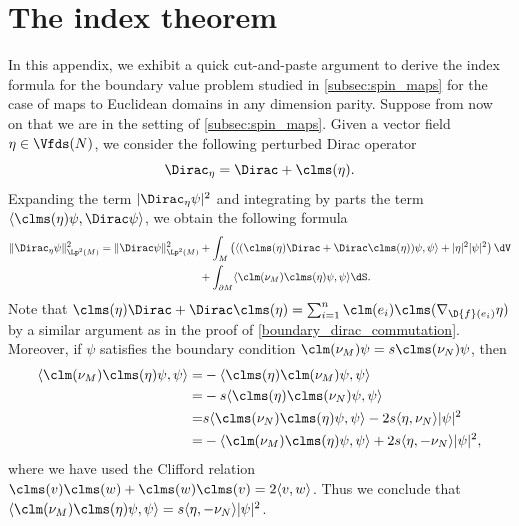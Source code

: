 \documentclass[a4paper,11pt]{amsart}
\numberwithin{equation}{section}
\begin{document}
\appendix








\section{The index theorem}\label{appendix_index_theorem}
In this appendix, we exhibit a quick cut-and-paste argument to derive the index formula for the boundary value problem studied in \cref{subsec:spin_maps} for the case of maps to Euclidean domains in any dimension parity.
Suppose from now on that we are in the setting of \cref{subsec:spin_maps}.
Given a vector field \(\eta \in \Vfds(N)\), we consider the following perturbed Dirac operator
\[
    \Dirac_\eta = \Dirac + \clms(\eta).
\]
Expanding the term \(|\Dirac_\eta \psi|^2\) and integrating by parts the term $\langle \clms(\eta)\psi, \Dirac \psi\rangle$, we obtain the following formula
\begin{align}
    \|\Dirac_\eta \psi\|_{\Lp^2(M)}^2 = \|\Dirac \psi \|_{\Lp^2(M)}^2 &+ \int_M \left( \langle (\clms(\eta) \Dirac + \Dirac \clms(\eta))\psi, \psi \rangle + \lvert \eta \rvert^2 \lvert \psi \rvert^2 \right) \dV \label{eq:callias_integral_formula} \\
    &+ \int_{\partial M} \langle \clm(\nu_M) \clms(\eta) \psi, \psi \rangle \dS \nonumber.
\end{align}
Note that \(\clms(\eta) \Dirac + \Dirac \clms(\eta) = \sum_{i=1}^n \clm(e_i) \clms(\nabla_{\D{f}(e_i)} \eta)\) by a similar argument as in the proof of \cref{boundary_dirac_commutation}.
Moreover, if \(\psi\) satisfies the boundary condition \(\clm(\nu_M) \psi = s \clms(\nu_N) \psi\), then 
\begin{align}
\begin{split}
    \langle \clm(\nu_M) \clms(\eta) \psi, \psi \rangle=&
    - \langle \clms(\eta)  \clm(\nu_M) \psi, \psi \rangle\\
    =& - s \langle \clms(\eta) \clms(\nu_N) \psi, \psi \rangle\\
    =& s \langle \clms(\nu_N) \clms(\eta) \psi, \psi \rangle - 2 s \langle \eta, \nu_N \rangle \lvert \psi \rvert^2 \\
    =&  - \langle \clm(\nu_M) \clms(\eta) \psi, \psi \rangle + 2 s \langle \eta, -\nu_N \rangle \lvert \psi \rvert^2,
    \end{split}
    \end{align}
where we have used the Clifford relation \(\clms(v)\clms(w) + \clms(w)\clms(v) = 2 \langle v, w \rangle\).
Thus we conclude that \(\langle \clm(\nu_M) \clms(\eta) \psi, \psi \rangle = s \langle \eta, -\nu_N \rangle |\psi|^2\).
\end{document}
